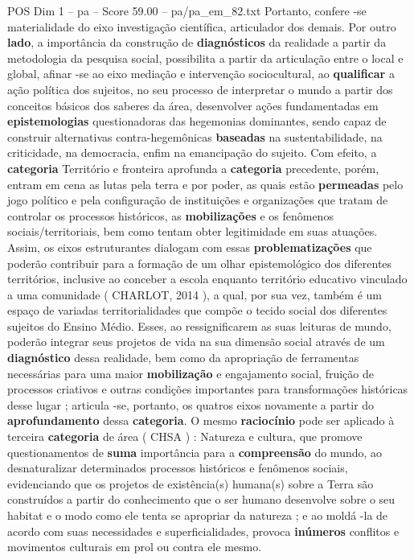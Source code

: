 \begin{textsample}{POS Dim 1 – pa – Score 59.00 – pa/pa\_em\_82.txt}
Portanto, confere -se materialidade do eixo investigação científica, articulador dos demais.
Por outro \textbf{lado}, a importância da construção de \textbf{diagnósticos} da realidade a partir da metodologia da pesquisa social, possibilita a partir da articulação entre o local e global, afinar -se ao eixo mediação e intervenção sociocultural, ao \textbf{qualificar} a ação política dos sujeitos, no seu processo de interpretar o mundo a partir dos conceitos básicos dos saberes da área, desenvolver ações fundamentadas em \textbf{epistemologias} questionadoras das hegemonias dominantes, sendo capaz de construir alternativas contra-hegemônicas \textbf{baseadas} na sustentabilidade, na criticidade, na democracia, enfim na emancipação do sujeito.
Com efeito, a \textbf{categoria} Território e fronteira aprofunda a \textbf{categoria} precedente, porém, entram em cena as lutas pela terra e por poder, as quais estão \textbf{permeadas} pelo jogo político e pela configuração de instituições e organizações que tratam de controlar os processos históricos, as \textbf{mobilizações} e os fenômenos sociais/territoriais, bem como tentam obter legitimidade em suas atuações.
Assim, os eixos estruturantes dialogam com essas \textbf{problematizações} que poderão contribuir para a formação de um olhar epistemológico dos diferentes territórios, inclusive ao conceber a escola enquanto território educativo vinculado a uma comunidade ( CHARLOT, 2014 ), a qual, por sua vez, também é um espaço de variadas territorialidades que compõe o tecido social dos diferentes sujeitos do Ensino Médio.
Esses, ao ressignificarem as suas leituras de mundo, poderão integrar seus projetos de vida na sua dimensão social através de um \textbf{diagnóstico} dessa realidade, bem como da apropriação de ferramentas necessárias para uma maior \textbf{mobilização} e engajamento social, fruição de processos criativos e outras condições importantes para transformações históricas desse lugar ; articula -se, portanto, os quatros eixos novamente a partir do \textbf{aprofundamento} dessa \textbf{categoria}.
O mesmo \textbf{raciocínio} pode ser aplicado à terceira \textbf{categoria} de área ( CHSA ) : Natureza e cultura, que promove questionamentos de \textbf{suma} importância para a \textbf{compreensão} do mundo, ao desnaturalizar determinados processos históricos e fenômenos sociais, evidenciando que os projetos de existência(s) humana(s) sobre a Terra são construídos a partir do conhecimento que o ser humano desenvolve sobre o seu habitat e o modo como ele tenta se apropriar da natureza ; e ao moldá -la de acordo com suas necessidades e superficialidades, provoca \textbf{inúmeros} conflitos e movimentos culturais em prol ou contra ele mesmo.

\end{textsample}
